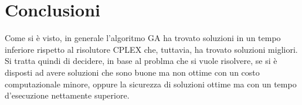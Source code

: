 
\section{Conclusioni}\label{sec:conclusioni}
Come si è visto, in generale l'algoritmo GA ha trovato soluzioni in un tempo inferiore rispetto al
risolutore CPLEX che, tuttavia, ha trovato soluzioni migliori.
Si tratta quindi di decidere, in base al problma che si vuole risolvere, se si è disposti
ad avere soluzioni che sono buone ma non ottime con un costo computazionale minore,
oppure la sicurezza di soluzioni ottime ma con un tempo d'esecuzione nettamente superiore.
